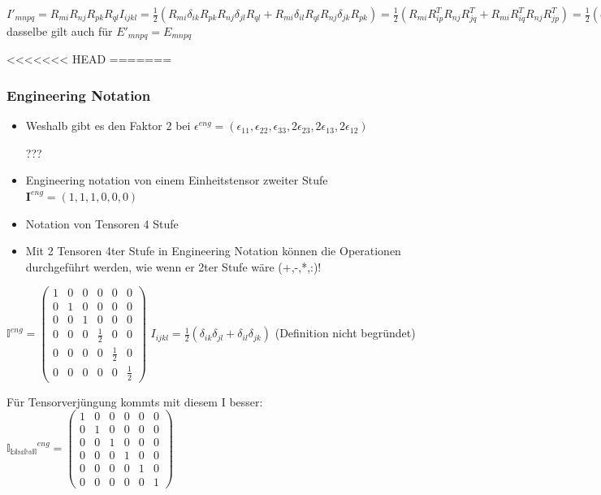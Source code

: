 \documentclass[a4paper]{scrartcl}
\begin{document}
$ I'_{mnpq}=R_{mi}R_{nj}R_{pk}R_{ql}I_{ijkl} = \frac{1}{2}(R_{mi}\delta_{ik}R_{pk}R_{nj}\delta_{jl}R_{ql} + R_{mi}\delta_{il}R_{ql}R_{nj}\delta_{jk}R_{pk})= \frac{1}{2}(R_{mi}R^T_{ip}R_{nj}R^T_{jq}+R_{mi}R^T_{iq}R_{nj}R^T_{jp})= \frac{1}{2}(\delta_{mp}\delta_{mq}\delta_{np})=I_{mnpq} $ dasselbe gilt auch für $ E'_{mnpq}=E_{mnpq}$


<<<<<<< HEAD
=======
\subsubsection{Engineering Notation}
\begin{itemize}
\item Weshalb gibt es den Faktor 2 bei $ \epsilon^{eng}=(\epsilon_{11},\epsilon_{22},\epsilon_{33},2\epsilon_{23},2\epsilon_{13},2\epsilon_{12}) $

???


\item Engineering notation von einem Einheitstensor zweiter Stufe
$ \textbf{I}^{eng}=(1,1,1,0,0,0) $


\item Notation von Tensoren 4 Stufe
\item Mit 2 Tensoren 4ter Stufe in Engineering Notation können die Operationen
durchgeführt werden, wie wenn er 2ter Stufe wäre (+,-,*,:)!

\end{itemize}
$ \mathbb{I}^{eng}=
\begin{pmatrix}
1 & 0 & 0 & 0 & 0 & 0 \\ 
0 & 1 & 0 & 0 & 0 & 0 \\ 
0 & 0 & 1 & 0 & 0 & 0 \\ 
0 & 0 & 0 & \frac{1}{2} & 0 & 0 \\ 
0 & 0 & 0 & 0 & \frac{1}{2} & 0 \\ 
0 & 0 & 0 & 0 & 0 & \frac{1}{2}
\end{pmatrix} 
$ $I_{ijkl} = \frac{1}{2} (\delta_{ik} \delta_{jl} + \delta_{il} \delta_{jk}) $
(Definition nicht begründet)

Für Tensorverjüngung kommts mit diesem I besser:\\
$ \mathbb{I_{\text{bischsil}}}^{eng}=
\begin{pmatrix}
1 & 0 & 0 & 0 & 0 & 0 \\ 
0 & 1 & 0 & 0 & 0 & 0 \\ 
0 & 0 & 1 & 0 & 0 & 0 \\ 
0 & 0 & 0 & 1 & 0 & 0 \\ 
0 & 0 & 0 & 0 & 1 & 0 \\ 
0 & 0 & 0 & 0 & 0 & 1
\end{pmatrix}$
\end{document}
